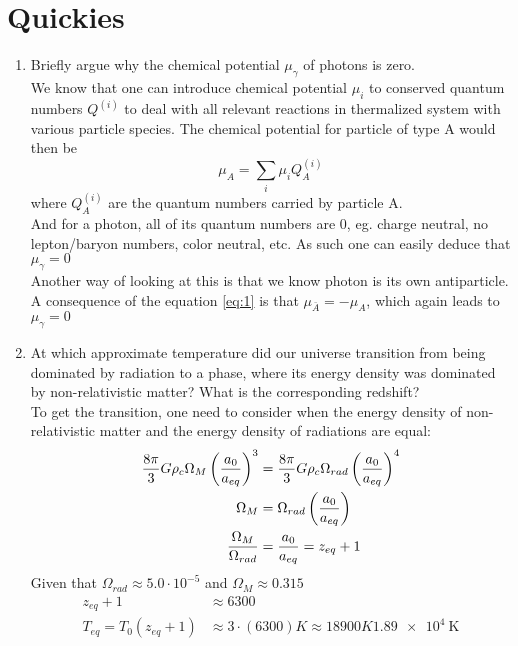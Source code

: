 \section{Quickies}
\begin{enumerate}[label=(\alph*)]
\item Briefly argue why the chemical potential $\mu_{\gamma}$ of photons is zero.\\

We know that one can introduce chemical potential $\mu_i$ to conserved quantum numbers $Q^{(i)}$ to deal with all relevant reactions in thermalized system with various
particle species. The chemical potential for particle of type A would then be
\begin{equation} \label{eq:1}
\mu_A = \sum_i \mu_i Q^{(i)}_A
\end{equation}
where $Q^{(i)}_A$ are the quantum numbers carried by particle A.\\

And for a photon, all of its quantum numbers are 0, eg. charge neutral, no lepton/baryon numbers, color neutral, etc. As such one can easily deduce that $\mu_{\gamma} = 0$\\

Another way of looking at this is that we know photon is its own antiparticle. A consequence of the equation \ref{eq:1} is that $\mu_{\bar{A}} = -\mu_A $, which again leads to $\mu_{\gamma}=0$ %
\item At which approximate temperature did our universe transition from being dominated by radiation to a phase, where its energy density was dominated by non-relativistic matter? What is the corresponding redshift?\\
To get the transition, one need to consider when the energy density of non-relativistic matter and the energy density of radiations are equal:
\begin{align}
\frac{8\pi}{3}G\rho_c \Omega_M \left( \frac{a_0}{a_{eq}} \right)^3 &= \frac{8\pi}{3}G\rho_c \Omega_{rad} \left( \frac{a_0}{a_{eq}} \right)^4 \\
\Omega_M &= \Omega_{rad} \left( \frac{a_0}{a_{eq}} \right) \notag \\
\frac{\Omega_M }{\Omega_{rad}} &= \frac{a_0}{a_{eq}} = z_{eq} +1 
\end{align}
Given that $\Omega_{rad} \approx 5.0\cdot 10^{-5}$ and $\Omega_M \approx 0.315$ 
\begin{align}
z_{eq} +1 &\approx 6300\\ 
T_{eq} =T_0(z_{eq} +1 ) &\approx 3\cdot(6300) K \approx 18900K
\SI{1.89e4}{\kelvin}
\end{align}

\end{enumerate}
